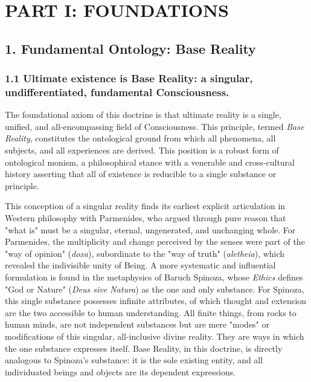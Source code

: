 \section*{PART I: FOUNDATIONS}


\subsection*{1. Fundamental Ontology: Base Reality}


\subsubsection*{1.1 Ultimate existence is Base Reality: a singular, undifferentiated, fundamental Consciousness.}


The foundational axiom of this doctrine is that ultimate reality is a single, unified, and all-encompassing field of Consciousness. This principle, termed \textit{Base Reality}, constitutes the ontological ground from which all phenomena, all subjects, and all experiences are derived. This position is a robust form of ontological monism, a philosophical stance with a venerable and cross-cultural history asserting that all of existence is reducible to a single substance or principle.


This conception of a singular reality finds its earliest explicit articulation in Western philosophy with Parmenides, who argued through pure reason that "what is" must be a singular, eternal, ungenerated, and unchanging whole. For Parmenides, the multiplicity and change perceived by the senses were part of the "way of opinion" (\textit{doxa}), subordinate to the "way of truth" (\textit{aletheia}), which revealed the indivisible unity of Being. A more systematic and influential formulation is found in the metaphysics of Baruch Spinoza, whose \textit{Ethics} defines "God or Nature" (\textit{Deus sive Natura}) as the one and only substance. For Spinoza, this single substance possesses infinite attributes, of which thought and extension are the two accessible to human understanding. All finite things, from rocks to human minds, are not independent substances but are mere "modes" or modifications of this singular, all-inclusive divine reality. They are ways in which the one substance expresses itself. Base Reality, in this doctrine, is directly analogous to Spinoza's substance: it is the sole existing entity, and all individuated beings and objects are its dependent expressions.


